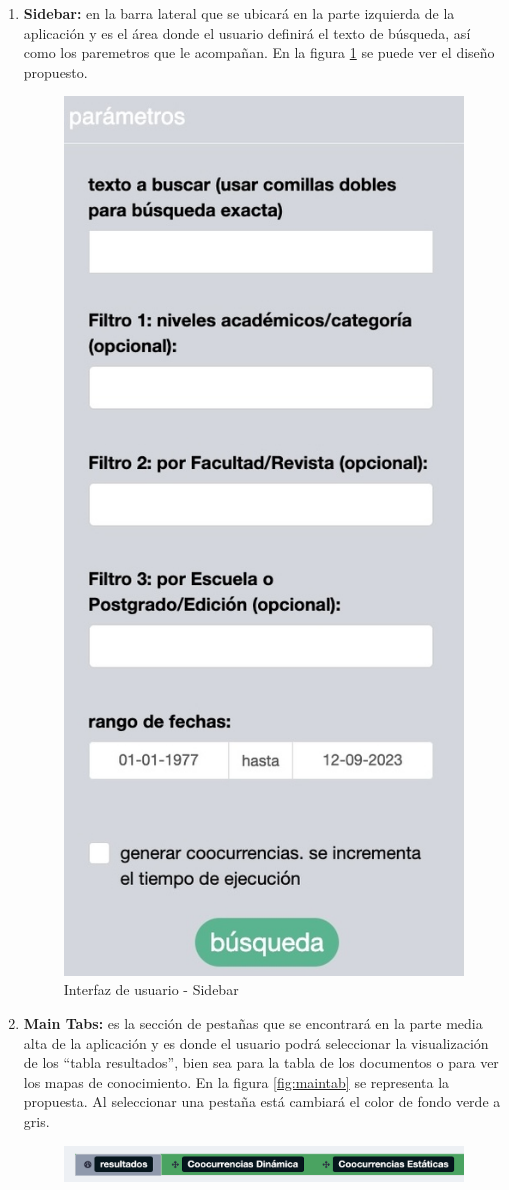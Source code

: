 \documentclass[
  12pt,
  openany]{book}
\begin{document}
\begin{enumerate}
\def\labelenumi{\arabic{enumi}.}
\item
  \textbf{Sidebar:} en la barra lateral que se ubicará en la parte izquierda de la aplicación y es el área donde el usuario definirá el texto de búsqueda, así como los paremetros que le acompañan. En la figura \ref{fig:sidebar2} se puede ver el diseño propuesto.

  \begin{figure}

  {\centering \includegraphics[width=0.35\linewidth]{images/05-desarrollo/4_ciclo/UI/sidebar} 

  }

  \caption{Interfaz de usuario - Sidebar}\label{fig:sidebar2}
  \end{figure}
\item
  \textbf{Main Tabs:} es la sección de pestañas que se encontrará en la parte media alta de la aplicación y es donde el usuario podrá seleccionar la visualización de los ``tabla resultados'', bien sea para la tabla de los documentos o para ver los mapas de conocimiento. En la figura \ref{fig:maintab} se representa la propuesta. Al seleccionar una pestaña está cambiará el color de fondo verde a gris.

  \begin{figure}

  {\centering \includegraphics[width=0.9\linewidth]{images/05-desarrollo/4_ciclo/UI/maintab} 

}
\end{figure}
\end{enumerate}
\end{document}

